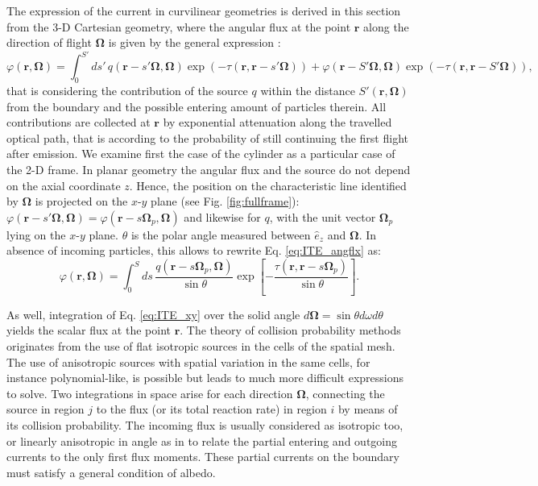 \documentclass{ictt26}
\providecommand{\DIFadd}[1]{{\protect\color{blue}\uwave{#1}}} %
\providecommand{\DIFaddbegin}{} %
\providecommand{\DIFaddend}{} %
\newcommand{\DIFaddincludegraphics}[2][]{{\color{blue}\fbox{\DIFOincludegraphics[#1]{#2}}}} %
\DeclareRobustCommand{\DIFaddbegin}{\DIFOaddbegin \let\includegraphics\DIFaddincludegraphics} %
\DeclareRobustCommand{\DIFaddend}{\DIFOaddend \let\includegraphics\DIFOincludegraphics} %
\begin{document}
The expression of the current in curvilinear geometries is derived in this section from the 3-D Cartesian geometry, where the angular flux at the point $\mathbf{r}$ along the direction of flight $\mathbf{\Omega}$ is given by the general expression \cite{lewis1984computational}:
\begin{equation}
\varphi(\mathbf{r}, \mathbf{\Omega}) = \int_0^{S'}{ds'\, q(\mathbf{r} - s' \mathbf{\Omega}, \mathbf{\Omega}) \exp(-\tau(\mathbf{r}, \mathbf{r} - s' \mathbf{\Omega}))} + \varphi(\mathbf{r} - S' \mathbf{\Omega}, \mathbf{\Omega}) \exp(-\tau(\mathbf{r}, \mathbf{r} - S' \mathbf{\Omega})),
\label{eq:ITE_angflx}
\end{equation}
that is considering the contribution of the source $q$ within the distance $S'(\mathbf{r}, \mathbf{\Omega})$ from the boundary and the possible entering amount of particles therein. All contributions are collected at $\mathbf{r}$ by exponential attenuation along the travelled optical path, that is according to the probability of still continuing the first flight after emission. We examine first the case of the cylinder as a particular case of the 2-D frame. In planar geometry the angular flux and the source do not depend on the axial coordinate $z$. Hence, the position on the characteristic line identified by $\mathbf{\Omega}$ is projected on the $x$-$y$ plane (see Fig. \ref{fig:fullframe}): $\varphi(\mathbf{r} - s' \mathbf{\Omega},\mathbf{\Omega}) =\allowbreak \varphi(\mathbf{r} - s \mathbf{\Omega}_p,\mathbf{\Omega})$ and likewise for $q$, with the unit vector $\mathbf{\Omega}_p$ lying on the $x$-$y$ plane. $\theta$ is the polar angle measured between $\hat{e}_z$ and $\mathbf{\Omega}$. In absence of incoming particles, this allows to rewrite Eq. \ref{eq:ITE_angflx} as:
\begin{equation}
\varphi(\mathbf{r}, \mathbf{\Omega}) = \int_0^S{ds\, \frac{q(\mathbf{r} - s \mathbf{\Omega}_p, \mathbf{\Omega})}{\sin \theta} \exp \left[ -\frac{\tau(\mathbf{r}, \mathbf{r} - s \mathbf{\Omega}_p)}{\sin \theta} \right]}. %
\label{eq:ITE_xy}
\end{equation}

As well, integration of Eq. \ref{eq:ITE_xy} over the solid angle $d\mathbf{\Omega} = \sin \theta d\omega d \theta$ yields the scalar flux at the point $\mathbf{r}$. The theory of collision probability methods \DIFaddbegin \DIFadd{(CPM) }\DIFaddend originates from the use of flat isotropic sources in the cells of the spatial mesh. The use of anisotropic sources with spatial variation in the same cells, for instance polynomial-like, is possible but leads to much more difficult expressions to solve. Two integrations in space arise for each direction $\mathbf{\Omega}$, connecting the source in region $j$ to the flux (or its total reaction rate) in region $i$ by means of its collision probability. The incoming flux is usually considered as isotropic too, or linearly anisotropic in angle as in \cite{hebert2009applied} to relate the partial entering and outgoing currents to the only first flux moments. These partial currents on the boundary must satisfy a general condition of albedo.
\end{document}
